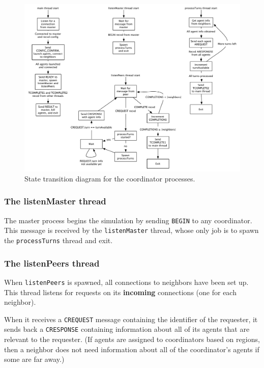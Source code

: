 \begin{figure}
    \begin{center}
        \includegraphics[scale=0.5]{figures/state_coord.pdf}
    \end{center}
    \caption{State transition diagram for the coordinator processes.}
    \label{coord}
\end{figure}

\subsubsection{The listenMaster thread}

The master process begins the simulation by sending \texttt{BEGIN} to any coordinator. This message is received by the \texttt{listenMaster} thread, whose only job is to spawn the \texttt{processTurns} thread and exit.

\subsubsection{The listenPeers thread}

When \texttt{listenPeers} is spawned, all connections to neighbors have been set up. This thread listens for requests on its \textbf{incoming} connections (one for each neighbor).

When it receives a \texttt{CREQUEST} message containing the identifier of the requester, it sends back a \texttt{CRESPONSE} containing information about all of its agents that are relevant to the requester. (If agents are assigned to coordinators based on regions, then a neighbor does not need information about all of the coordinator's agents if some are far away.)


